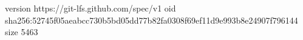 version https://git-lfs.github.com/spec/v1
oid sha256:52745f05aeabcc730b5bd05dd77b82fa0308f69ef11d9e993b8e24907f796144
size 5463
